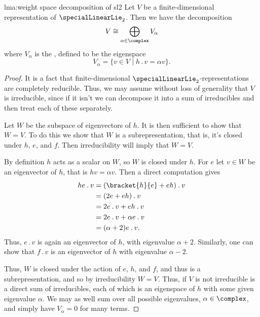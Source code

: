 \documentclass[fleqn]{NotesClass}
\newcommand{\action}{\mathbin{.}}
\newcommand{\isomorphic}{\cong}
\begin{document}
    \begin{lma}{}{lma:weight space decomposition of sl2}
        Let \(V\) be a finite-dimensional representation of \(\specialLinearLie_2\).
        Then we have the decomposition
        \begin{equation}
            V \isomorphic \bigoplus_{\alpha \in \complex} V_\alpha
        \end{equation}
        where \(V_\alpha\) is the , defined to be the eigenspace
        \begin{equation}
            V_\alpha = \{v \in V \mid h \action v = \alpha v\}.
        \end{equation}
        \begin{proof}
            It is a fact that finite-dimensional \(\specialLinearLie_2\)-representations are completely reducible.
            Thus, we may assume without loss of generality that \(V\) is irreducible, since if it isn't we can decompose it into a sum of irreducibles and then treat each of these separately.
            
            Let \(W\) be the subspace of eigenvectors of \(h\).
            It is then sufficient to show that \(W = V\).
            To do this we show that \(W\) is a subrepresentation, that is, it's closed under \(h\), \(e\), and \(f\).
            Then irreducibility will imply that \(W = V\).
            
            By definition \(h\) acts as a scalar on \(W\), so \(W\) is closed under \(h\).
            For \(e\) let \(v \in W\) be an eigenvector of \(h\), that is \(hv = \alpha v\).
            Then a direct computation gives
            \begin{align}
                he \action v &= (\bracket{h}{e} + eh) \action v\\
                &= (2e + eh) \action v\\
                &= 2e \action v + eh \action v\\
                &= 2e \action v + \alpha e\action v\\
                &= (\alpha + 2) e \action v.
            \end{align}
            Thus, \(e \action v\) is again an eigenvector of \(h\), with eigenvalue \(\alpha + 2\).
            Similarly, one can show that \(f \action v\) is an eigenvector of \(h\) with eigenvalue \(\alpha - 2\).
            
            Thus, \(W\) is closed under the action of \(e\), \(h\), and \(f\), and thus is a subrepresentation, and so by irreducibility \(W = V\).
            Thus, if \(V\) is not irreducible is a direct sum of irreducibles, each of which is an eigenspace of \(h\) with some given eigenvalue \(\alpha\).
            We may as well sum over all possible eigenvalues, \(\alpha \in \complex\), and simply have \(V_\alpha = 0\) for many terms.
        \end{proof}
    \end{lma}
    
\end{document}

